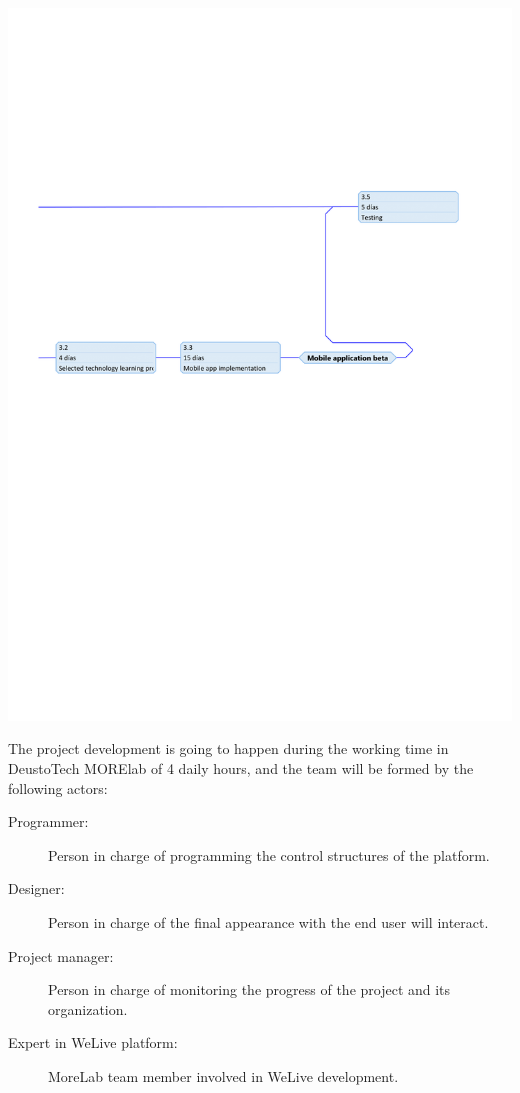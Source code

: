 \documentclass{DeustoFDP}
\begin{document}
\begin{center}
	\includegraphics[width=1\linewidth]{fig/precedence-4}
\end{center}
\newpage

The project development is going to happen during the working time in DeustoTech MORElab of 4 daily hours, and the team will be formed by the following actors:

\begin{description}
	\item[Programmer:] Person in charge of programming the control structures of the platform.
	\item[Designer:] Person in charge of the final appearance with the end user will interact.
	\item[Project manager:] Person in charge of monitoring the progress of the project and its organization.
	\item[Expert in WeLive platform:] MoreLab team member involved in WeLive development.
\end{description}
\end{document}
